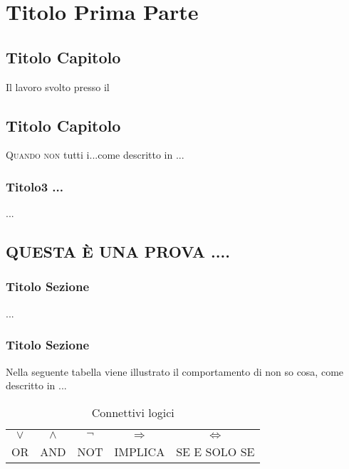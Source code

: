 
\part{Titolo Prima Parte}\label{prima}   
\chapter{Titolo Capitolo}
Il lavoro svolto presso il \dia

\chapter{Titolo Capitolo}\label{sec:cond}
\lettrine[lines=1]{Q}{uando non} tutti i...come descritto in
\cite{Garey-Johnson} ...

\section[Titolo Sezione ...] {Titolo3 ...}\label{sec:logica}
...

\chapter[QUESTA \`E UNA PROVA ...]
{QUESTA \`E UNA PROVA ....}\label{sec:stato}

\section{Titolo Sezione}
...

\section{Titolo Sezione}
Nella seguente tabella viene illustrato il comportamento di non so
cosa, come descritto in \cite{altra-citazione}...

\begin{table}
\begin{center}
 \begin{tabular}{|c|c|c|c|c|}\hline
    $\vee$ & $\wedge$ & $\neg$ & $\Rightarrow$ & $\Leftrightarrow$\\
    OR & AND & NOT & IMPLICA & SE E SOLO SE \\ \hline
 \end{tabular}
 \caption{Connettivi logici}
 \label{tab:lp}
\end{center}
\end{table}



